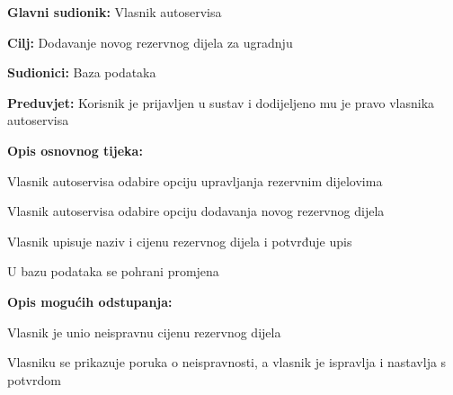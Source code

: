 \noindent {}
\begin{packed_item}
	
	\item \textbf{Glavni sudionik: } Vlasnik autoservisa
	\item  \textbf{Cilj:} Dodavanje novog rezervnog dijela za ugradnju
	\item  \textbf{Sudionici:} Baza podataka
	\item  \textbf{Preduvjet:} Korisnik je prijavljen u sustav i dodijeljeno
	mu je pravo vlasnika autoservisa
	\item  \textbf{Opis osnovnog tijeka:}
	
	\item[] \begin{packed_enum}
		
		\item Vlasnik autoservisa odabire opciju upravljanja rezervnim dijelovima
		\item Vlasnik autoservisa odabire opciju dodavanja novog rezervnog dijela
		\item Vlasnik upisuje naziv i cijenu rezervnog dijela i potvrđuje upis
		\item U bazu podataka se pohrani promjena
		
	\end{packed_enum}
	
	\item  \textbf{Opis mogućih odstupanja:}
	\item[] \begin{packed_item}
		\item[3.a] Vlasnik je unio neispravnu cijenu rezervnog dijela
		\item[] \begin{packed_enum}
			\item Vlasniku se prikazuje poruka o neispravnosti, a vlasnik je
			ispravlja i nastavlja s potvrdom
		\end{packed_enum}
	\end{packed_item}
	
\end{packed_item}


